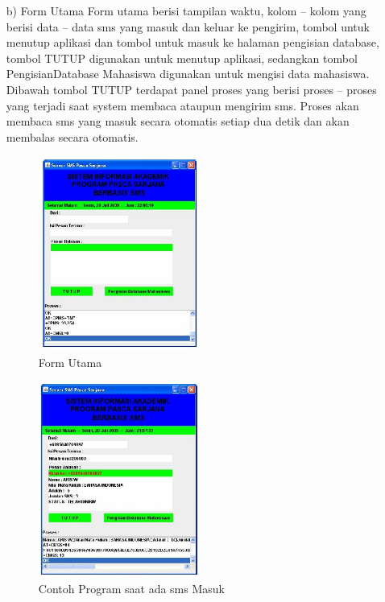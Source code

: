 \documentclass{jtetiproposalskripsi}
\begin{document}
\begin{itemize}
\item[b)]Form Utama
Form utama berisi tampilan waktu, kolom – kolom yang berisi data – data sms yang masuk dan keluar ke pengirim, tombol untuk menutup aplikasi dan tombol untuk masuk ke halaman pengisian database, tombol TUTUP digunakan untuk menutup aplikasi, sedangkan tombol PengisianDatabase Mahasiswa digunakan untuk mengisi data mahasiswa. Dibawah tombol TUTUP terdapat panel proses yang berisi proses – proses yang terjadi saat system membaca ataupun mengirim sms. Proses akan membaca sms yang masuk secara otomatis setiap dua detik dan akan membalas secara otomatis.
\begin{figure}[ht!]
  \centering
    \includegraphics[width=0.5\textwidth]{gambar/8}
    \caption{Form Utama}
    \label{wsn}
\end{figure}
\newpage

\begin{figure}[ht!]
  \centering
    \includegraphics[width=0.5\textwidth]{gambar/9}
    \caption{Contoh Program saat ada sms Masuk}
    \label{wsn}
\end{figure}
\newpage


\end{itemize}
\end{document}
